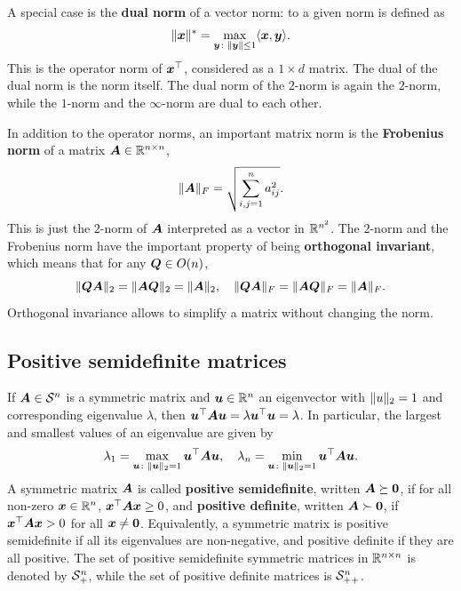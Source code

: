 \documentclass[11pt,a4paper]{memoir}
\begin{document}
A special case is the \textbf{dual norm} of a vector norm:
to a given norm is defined as
\begin{equation*}
 \Vert {\bm{x}}\Vert^* = \max_{\bm{y}\colon \Vert {\bm{y}}\Vert\leq 1} \langle {\bm{x}}, {\bm{y}} \rangle.
\end{equation*}
This is the operator norm of $\bm{x}^{\top}$, considered as a $1\times d$ matrix. The dual of the dual norm is the norm itself.
The dual norm of the $2$-norm is again the $2$-norm, while the $1$-norm and the $\infty$-norm are dual to each other.

In addition to the operator norms, an important matrix norm is the \textbf{Frobenius norm} of a matrix $\bm{A}\in \mathbb{R}^{n\times n}$, 
\begin{equation*}
 \Vert {\bm{A}}\Vert_{F} = \sqrt{\sum_{i,j=1}^n a_{ij}^2}.
\end{equation*}
This is just the $2$-norm of $\bm{A}$ interpreted as a vector in $\mathbb{R}^{n^2}$. The $2$-norm and the Frobenius norm have the important property of being \textbf{orthogonal invariant},
which means that for any $\bm{Q}\in O(n)$,
\begin{equation*}
 \Vert {\bm{Q}\bm{A}}\Vert_2 = \Vert {\bm{A}\bm{Q}}\Vert_2 = \Vert {\bm{A}}\Vert_2, \quad \Vert {\bm{Q}\bm{A}}\Vert_F = \Vert {\bm{A}\bm{Q}}\Vert_F = \Vert {\bm{A}}\Vert_F.
\end{equation*}
Orthogonal invariance allows to simplify a matrix without changing the norm.

\subsection{Positive semidefinite matrices}
If $\bm{A}\in \mathcal{S}^n$ is a symmetric matrix and $\bm{u}\in \mathbb{R}^n$ an eigenvector with $\Vert {u}\Vert_2=1$ and corresponding eigenvalue $\lambda$, then $
 \bm{u}^{\top}\bm{A}\bm{u} = \lambda \bm{u}^{\top}\bm{u} = \lambda$.
In particular, the largest and smallest values of an eigenvalue are given by
\begin{equation*}
 \lambda_1 = \max_{\bm{u}\colon \Vert {\bm{u}}\Vert_2=1} \bm{u}^{\top}\bm{A}\bm{u}, \quad \lambda_n = \min_{\bm{u}\colon \Vert {\bm{u}}\Vert_2=1} \bm{u}^{\top}\bm{A}\bm{u}.
\end{equation*}
A symmetric matrix $\bm{A}$ is called \textbf{positive semidefinite}, written $\bm{A}\succeq \bm{0}$, if for all non-zero $\bm{x}\in \mathbb{R}^n$, $\bm{x}^{\top}\bm{A}\bm{x}\geq 0$, and \textbf{positive definite}, written $\bm{A}\succ \bm{0}$, if $\bm{x}^{\top}\bm{A}\bm{x}>0$ for all $\bm{x}\neq \bm{0}$. Equivalently, a symmetric matrix is positive semidefinite if all its eigenvalues are non-negative, and positive definite if they are all positive.
The set of positive semidefinite symmetric matrices in $\mathbb{R}^{n\times n}$ is denoted by $\mathcal{S}_+^n$, while the set of positive definite matrices is $\mathcal{S}_{++}^n$. 
\end{document}
